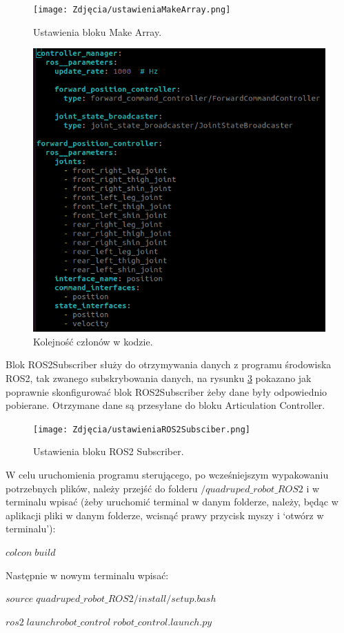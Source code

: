 \documentclass[12pt]{article}
\begin{document}
\begin{figure}[h]
    \centering
    \texttt{[image: Zdjęcia/ustawieniaMakeArray.png]}
    \caption{Ustawienia bloku Make Array.}
    \label{fig:makeArray}
\end{figure}

\begin{figure}
    \centering
    \includegraphics[width=0.5\linewidth]{Zdjęcia/kolejnoscJointow.png}
    \caption{Kolejność członów w kodzie.}
    \label{kolejnoscJointow}
\end{figure}

Blok ROS2Subscriber służy do otrzymywania danych z programu środowiska ROS2, tak zwanego subskrybowania danych, na rysunku \ref{fig:subscriberROS2} pokazano jak poprawnie skonfigurować blok ROS2Subscriber żeby dane były odpowiednio pobierane. Otrzymane dane są przesyłane do bloku Articulation Controller.

\begin{figure}[h]
    \centering
    \texttt{[image: Zdjęcia/ustawieniaROS2Subsciber.png]}
    \caption{Ustawienia bloku ROS2 Subscriber.}
    \label{fig:subscriberROS2}
\end{figure}



W celu uruchomienia programu sterującego, po wcześniejszym wypakowaniu potrzebnych plików,  należy przejść do folderu $/quadruped\_robot\_ROS2$ i w terminalu wpisać (żeby uruchomić terminal w danym folderze, należy, będąc w aplikacji pliki w danym folderze, wcisnąć prawy przycisk myszy i ‘otwórz w terminalu’):

$colcon\; build$

Następnie w nowym terminalu wpisać:


$source\; quadruped\_robot\_ROS2/install/setup.bash$

$ros2\; launch robot\_control\; robot\_control.launch.py$
\end{document}

